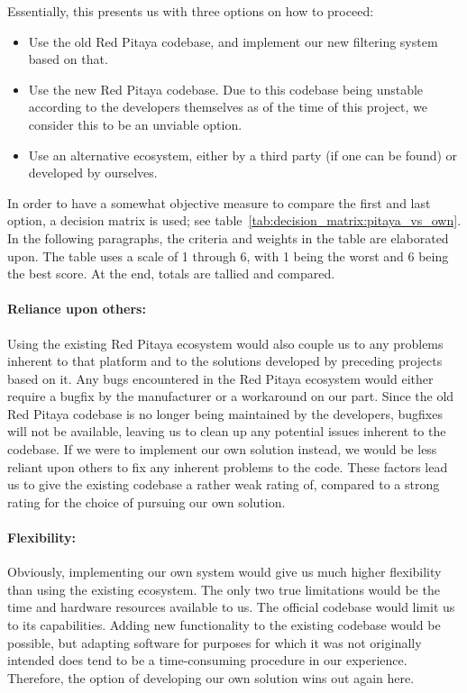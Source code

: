 Essentially, this presents us with three options on how to proceed:
\begin{itemize}
    \item
        Use  the old  Red Pitaya  codebase,  and implement  our new  filtering
        system based  on that.
    \item
        Use the new  Red Pitaya codebase. Due to this  codebase being unstable
        according to the developers themselves as of the time of this project,
        we consider this to be an unviable option.
    \item
        Use an alternative  ecosystem, either by a third party  (if one can be
        found) or developed by ourselves.
\end{itemize}
In   order    to   have    a   somewhat    objective   measure    to   compare
the   first   and   last   option,    a   decision   matrix   is   used;   see
table~\ref{tab:decision_matrix:pitaya_vs_own}. In  the  following  paragraphs,
the criteria  and weights in the  table are elaborated upon. The  table uses a
scale of  \num{1} through \num{6},  with \num{1}  being the worst  and \num{6}
being the best score. At the end, totals are tallied and compared.

\paragraph{Reliance  upon others:} Using  the  existing  Red Pitaya  ecosystem
would also  couple us  to any problems  inherent to that  platform and  to the
solutions developed by preceding projects based on it. Any bugs encountered in
the Red Pitaya ecosystem would either  require a bugfix by the manufacturer or
a workaround on our part. Since the old Red Pitaya codebase is no longer being
maintained by  the developers, bugfixes will  not be available, leaving  us to
clean  up  any potential  issues  inherent  to  the  codebase. If we  were  to
implement our  own solution instead, we  would be less reliant  upon others to
fix  any inherent  problems to  the code. These  factors lead  us to  give the
existing codebase a rather weak rating of, compared to a strong rating for the
choice of pursuing our own solution.

\paragraph{Flexibility:} Obviously, implementing our own  system would give us
much higher flexibility  than using the existing ecosystem. The  only two true
limitations would  be the  time and  hardware resources  available to  us. The
official codebase would limit us to its capabilities. Adding new functionality
to the existing codebase would be possible, but adapting software for purposes
for which  it was  not originally  intended does tend  to be  a time-consuming
procedure  in our  experience.  Therefore,  the option  of developing  our own
solution wins out again here.

